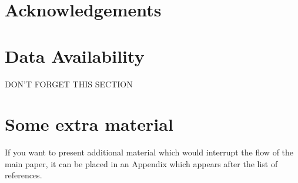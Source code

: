 \documentclass[fleqn,usenatbib]{mnras}
\begin{document}
\section*{Acknowledgements}



\section*{Data Availability}

DON'T FORGET THIS SECTION










\appendix

\section{Some extra material}

If you want to present additional material which would interrupt the flow of the main paper,
it can be placed in an Appendix which appears after the list of references.



\bsp	%
\end{document}
